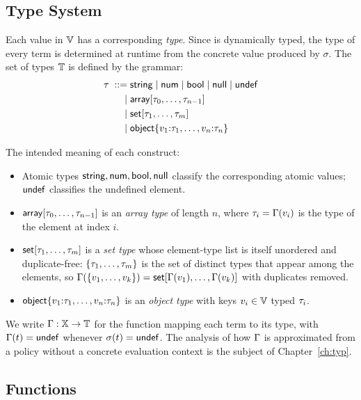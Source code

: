\subsection{Type System}
\label{ss:types}


Each value in $\mathbb{V}$ has a corresponding \emph{type}.
Since \rego is dynamically typed, the type of every term is determined at runtime from the concrete value produced by $\sigma$.
The set of \rego types $\mathbb{T}$ is defined by the grammar:
\begin{align*}
\tau \;::=\; & \mathsf{string} \mid \mathsf{num} \mid \mathsf{bool} \mid \mathsf{null} \mid \mathsf{undef} \\
   \mid\;   & \mathsf{array}[{\tau_0,\ldots,\tau_{n-1}}] \\
   \mid\;   & \mathsf{set}[{\tau_1,\ldots,\tau_m}] \\
   \mid\;   & \mathsf{object}\{v_1{:}\tau_1,\ldots,v_n{:}\tau_n\}
\end{align*}

The intended meaning of each construct:
\begin{itemize}
  \item Atomic types $\mathsf{string}, \mathsf{num}, \mathsf{bool}, \mathsf{null}$ classify the corresponding atomic values;
        $\mathsf{undef}$ classifies the undefined element.
  \item $\mathsf{array}[{\tau_0,\ldots,\tau_{n-1}}]$ is an \emph{array type} of length $n$,
        where $\tau_i = \Gamma(v_i)$ is the type of the element at index $i$.
  \item $\mathsf{set}[{\tau_1,\ldots,\tau_m}]$ is a \emph{set type} whose element-type list
        is itself unordered and duplicate-free: $\{\tau_1,\ldots,\tau_m\}$ is the set of
        distinct types that appear among the elements, so $\Gamma(\{v_1,\ldots,v_k\}) =
        \mathsf{set}[{\Gamma(v_1),\ldots,\Gamma(v_k)}]$ with duplicates removed.
  \item $\mathsf{object}\{v_1{:}\tau_1,\ldots,v_n{:}\tau_n\}$ is an \emph{object type}
        with keys $v_i \in \mathbb{V}$ typed $\tau_i$.
\end{itemize}

We write $\Gamma : \mathbb{X} \to \mathbb{T}$ for the function mapping each term to its type,
with $\Gamma(t) = \mathsf{undef}$ whenever $\sigma(t) = \mathsf{undef}$.
The analysis of how $\Gamma$ is approximated from a policy without a concrete evaluation
context is the subject of Chapter~\ref{ch:typ}.

\subsection{Functions}
\label{ss:functions}

